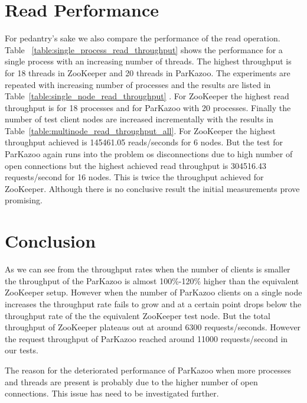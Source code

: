 \section{Read Performance}
For pedantry's sake we also compare the performance of the read operation. Table ~\ref{table:single_process_read_throughput} shows the performance for a single process with an increasing number of threads. The highest throughput is for 18 threads in ZooKeeper and 20 threads in ParKazoo. The experiments are repeated with increasing number of processes and the results are listed in Table~\ref{table:single_node_read_throughput} . For ZooKeeper the highest read throughput is for 18 processes and for ParKazoo with 20 processes. Finally the number of test client nodes are increased incrementally with the results in Table~\ref{table:multinode_read_throughput_all}. For ZooKeeper the highest throughput achieved is 145461.05 reads/seconds for 6 nodes. But the test for ParKazoo again runs into the problem os disconnections due to high number of open connections but the highest achieved read throughput is 304516.43 requests/second for 16 nodes. This is twice the throughput achieved for ZooKeeper. Although there is no conclusive result the initial measurements prove promising.




\section{Conclusion}
As we can see from the throughput rates when the number of clients is smaller the throughput of the ParKazoo is almost 100\%-120\% higher than the equivalent ZooKeeper setup. However when the number of ParKazoo clients on a single node increases the throughput rate fails to grow and at a certain point drops below the throughput rate of the the equivalent ZooKeeper test node. But the total throughput of ZooKeeper plateaus out at around 6300 requests/seconds. However the request throughput of ParKazoo reached around 11000 requests/second in our tests.

The reason for the deteriorated performance of ParKazoo when more processes and threads are present is probably due to the higher number of open connections. This issue has need to be investigated further. 
